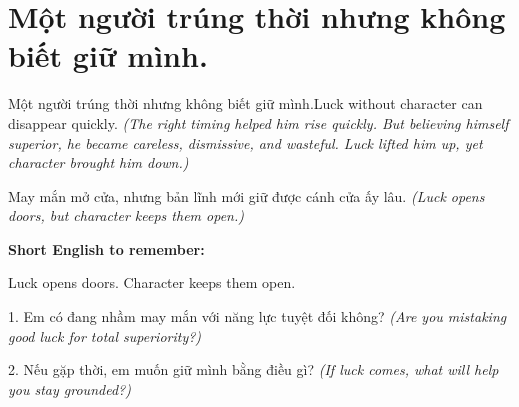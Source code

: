\section{Một người trúng thời nhưng không biết giữ mình.}
\begin{truyen}{Một người trúng thời nhưng không biết giữ mình.}{Luck without character can disappear quickly.}
\textit{(The right timing helped him rise quickly. But believing himself superior, he became careless, dismissive, and wasteful. Luck lifted him up, yet character brought him down.)}
\end{truyen}
\begin{baihoc}
May mắn mở cửa, nhưng bản lĩnh mới giữ được cánh cửa ấy lâu.
\textit{(Luck opens doors, but character keeps them open.)}
\end{baihoc}
\begin{ghinhoanh}
\textbf{Short English to remember:}

Luck opens doors. Character keeps them open.
\end{ghinhoanh}
\begin{tuhocnhanh}
1. Em có đang nhầm may mắn với năng lực tuyệt đối không? \textit{(Are you mistaking good luck for total superiority?)}

2. Nếu gặp thời, em muốn giữ mình bằng điều gì? \textit{(If luck comes, what will help you stay grounded?)}
\end{tuhocnhanh}
\ngancach

